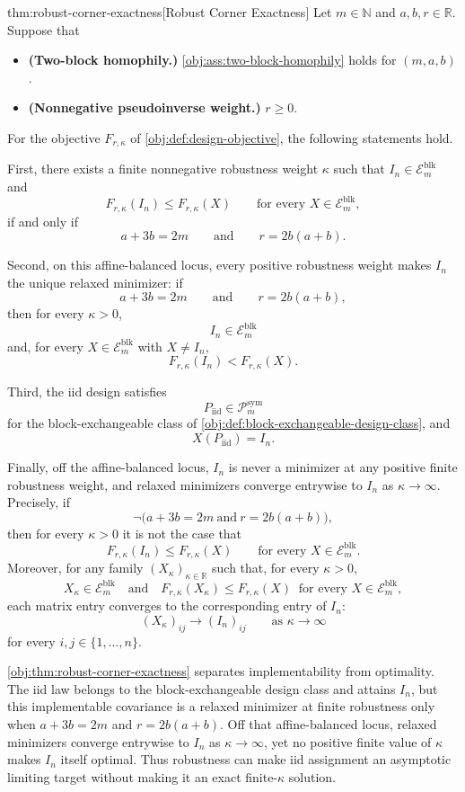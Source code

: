 \begin{theoremv}{thm:robust-corner-exactness}[Robust Corner Exactness]
Let \(m\in\mathbb N\) and \(a,b,r\in\mathbb R\). Suppose that
\begin{itemize}
\item \textbf{(Two-block homophily.)} \cref{obj:ass:two-block-homophily} holds for \((m,a,b)\).
\item \textbf{(Nonnegative pseudoinverse weight.)} \(r\ge 0\).
\end{itemize}
For the objective \(F_{r,\kappa}\) of \cref{obj:def:design-objective}, the following statements hold.

First, there exists a finite nonnegative robustness weight \(\kappa\) such that \(I_n\in\mathcal E_m^{\mathrm{blk}}\) and
\[
F_{r,\kappa}(I_n)\le F_{r,\kappa}(X)
\qquad\text{for every }X\in\mathcal E_m^{\mathrm{blk}},
\]
if and only if
\[
a+3b=2m
\qquad\text{and}\qquad
r=2b(a+b).
\]

Second, on this affine-balanced locus, every positive robustness weight makes \(I_n\) the unique relaxed minimizer: if
\[
a+3b=2m
\qquad\text{and}\qquad
r=2b(a+b),
\]
then for every \(\kappa>0\),
\[
I_n\in\mathcal E_m^{\mathrm{blk}}
\]
and, for every \(X\in\mathcal E_m^{\mathrm{blk}}\) with \(X\ne I_n\),
\[
F_{r,\kappa}(I_n)<F_{r,\kappa}(X).
\]

Third, the iid design satisfies
\[
P_{\mathrm{iid}}\in\mathcal P_m^{\mathrm{sym}}
\]
for the block-exchangeable class of \cref{obj:def:block-exchangeable-design-class}, and
\[
X(P_{\mathrm{iid}})=I_n.
\]

Finally, off the affine-balanced locus, \(I_n\) is never a minimizer at any positive finite robustness weight, and relaxed minimizers converge entrywise to \(I_n\) as \(\kappa\to\infty\). Precisely, if
\[
\neg\bigl(a+3b=2m\ \text{and}\ r=2b(a+b)\bigr),
\]
then for every \(\kappa>0\) it is not the case that
\[
F_{r,\kappa}(I_n)\le F_{r,\kappa}(X)
\qquad\text{for every }X\in\mathcal E_m^{\mathrm{blk}}.
\]
Moreover, for any family \((X_\kappa)_{\kappa\in\mathbb R}\) such that, for every \(\kappa>0\),
\[
X_\kappa\in\mathcal E_m^{\mathrm{blk}}
\quad\text{and}\quad
F_{r,\kappa}(X_\kappa)\le F_{r,\kappa}(X)
\ \text{ for every }X\in\mathcal E_m^{\mathrm{blk}},
\]
each matrix entry converges to the corresponding entry of \(I_n\):
\[
(X_\kappa)_{ij}\longrightarrow (I_n)_{ij}
\qquad\text{as }\kappa\to\infty
\]
for every \(i,j\in\{1,\ldots,n\}\).
\end{theoremv}

\cref{obj:thm:robust-corner-exactness} separates implementability from optimality. The iid law  belongs to the block-exchangeable design class and attains \(I_n\), but this implementable covariance is a relaxed minimizer at finite robustness only when \(a+3b=2m\) and \(r=2b(a+b)\). Off that affine-balanced locus, relaxed minimizers converge entrywise to \(I_n\) as \(\kappa\to\infty\), yet no positive finite value of \(\kappa\) makes \(I_n\) itself optimal. Thus robustness can make iid assignment an asymptotic limiting target without making it an exact finite-\(\kappa\) solution.

